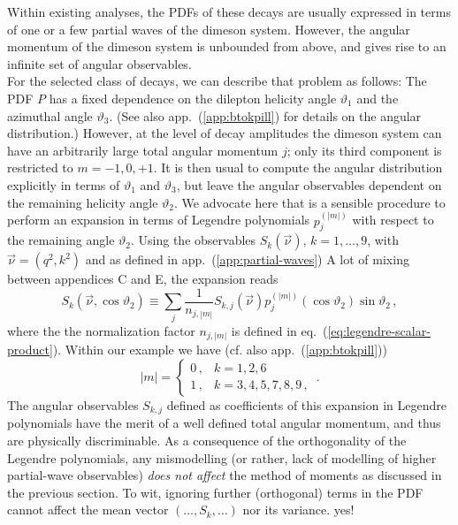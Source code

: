 \documentclass[aps,prd,reprint,nofootinbib,preprintnumbers]{revtex4}
\newcommand{\refapp}[1]{app.~(\ref{app:#1})}
\newcommand{\refeq}[1]{eq.~(\ref{eq:#1})}
\renewcommand{\theta}{\vartheta}
\newcommand{\fred}[1]{{\color{brown!85!black}#1}}
\begin{document}
Within existing analyses, the PDFs of these decays are usually expressed in terms of one or a few
partial waves of the dimeson system. However, the angular momentum of the dimeson system is unbounded
from above, and gives rise to an infinite set of angular observables.\\

For the selected class of decays, we can describe that problem as follows: The PDF $P$ has a fixed dependence on the dilepton
helicity angle $\theta_1$ and the azimuthal angle $\theta_3$. (See also \refapp{btokpill} for details
on the angular distribution.) However, at the level of decay amplitudes the dimeson system can have an arbitrarily
large total angular momentum $j$; only its third component is restricted to $m = -1,0,+1$.
It is then usual to compute the angular distribution explicitly in terms of $\theta_1$ and $\theta_3$, but leave
the angular observables dependent on the remaining helicity angle $\theta_2$.
We advocate here that is a sensible procedure to perform an expansion in terms of Legendre polynomials $p_{j}^{(|m|)}$
with respect to the remaining angle $\theta_2$. Using the observables $S_k(\vec{\nu})$, $k=1,\dots,9$, with $\vec{\nu}=(q^2, k^2)$
and as defined in \refapp{partial-waves} \fred{A lot of mixing between appendices C and E}, the expansion reads
\begin{equation}
    S_{k}(\vec{\nu},\cos\theta_2) \equiv \sum_{j} \frac{1}{n_{j,|m|}} S_{k,j}(\vec{\nu}) p_{j}^{(|m|)}(\cos\theta_2)\sin\theta_2\,,
\end{equation}
where the the normalization factor $n_{j,|m|}$ is defined in \refeq{legendre-scalar-product}. Within our
example we have (cf. also \refapp{btokpill})
\begin{equation}
    |m| = \begin{cases}
        0\,, & k = 1,2,6\,\\
        1\,, & k = 3,4,5,7,8,9\,,
    \end{cases}\,.
\end{equation}
The angular observables $S_{k,j}$ defined as coefficients of this expansion in Legendre polynomials
have the merit of a well defined total angular momentum, and thus are physically discriminable.
As a consequence of the orthogonality of the Legendre polynomials, any mismodelling (or rather, lack of modelling of higher
partial-wave observables) \emph{does not affect} the method of moments as discussed in the previous section. To wit,
ignoring further (orthogonal) terms in the PDF cannot affect the mean vector $(\dots, S_k, \dots)$ nor its variance. \fred{yes!}\\
\end{document}
